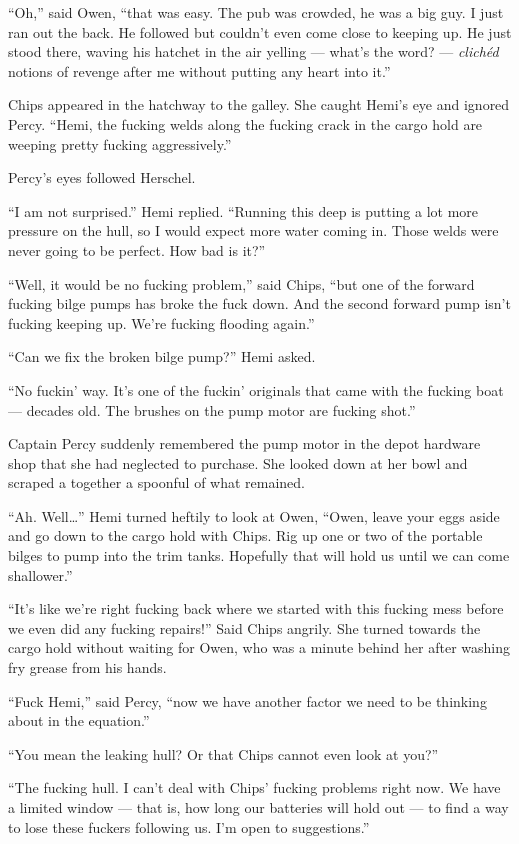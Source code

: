 \documentclass[
]{scrbook}
\begin{document}
``Oh,'' said Owen, ``that was easy. The pub was crowded, he was a big
guy. I just ran out the back. He followed but couldn't even come close
to keeping up. He just stood there, waving his hatchet in the air
yelling --- what's the word? --- \emph{clichéd} notions of revenge after
me without putting any heart into it.''

Chips appeared in the hatchway to the galley. She caught Hemi's eye and
ignored Percy. ``Hemi, the fucking welds along the fucking crack in the
cargo hold are weeping pretty fucking aggressively.''

Percy's eyes followed Herschel.

``I am not surprised.'' Hemi replied. ``Running this deep is putting a
lot more pressure on the hull, so I would expect more water coming in.
Those welds were never going to be perfect. How bad is it?''

``Well, it would be no fucking problem,'' said Chips, ``but one of the
forward fucking bilge pumps has broke the fuck down. And the second
forward pump isn't fucking keeping up. We're fucking flooding again.''

``Can we fix the broken bilge pump?'' Hemi asked.

``No fuckin' way. It's one of the fuckin' originals that came with the
fucking boat --- decades old. The brushes on the pump motor are fucking
shot.''

Captain Percy suddenly remembered the pump motor in the depot hardware
shop that she had neglected to purchase. She looked down at her bowl and
scraped a together a spoonful of what remained.

``Ah. Well\ldots{}'' Hemi turned heftily to look at Owen, ``Owen, leave
your eggs aside and go down to the cargo hold with Chips. Rig up one or
two of the portable bilges to pump into the trim tanks. Hopefully that
will hold us until we can come shallower.''

``It's like we're right fucking back where we started with this fucking
mess before we even did any fucking repairs!'' Said Chips angrily. She
turned towards the cargo hold without waiting for Owen, who was a minute
behind her after washing fry grease from his hands.

``Fuck Hemi,'' said Percy, ``now we have another factor we need to be
thinking about in the equation.''

``You mean the leaking hull? Or that Chips cannot even look at you?''

``The fucking hull. I can't deal with Chips' fucking problems right now.
We have a limited window --- that is, how long our batteries will hold
out --- to find a way to lose these fuckers following us. I'm open to
suggestions.''
\end{document}
